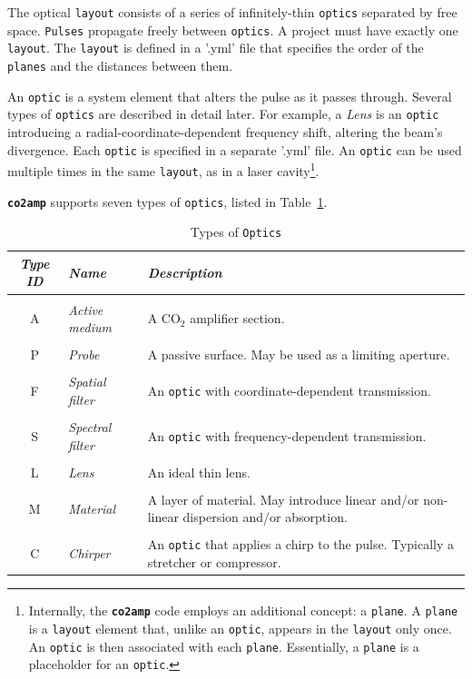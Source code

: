 The optical \texttt{layout} consists of a series of infinitely-thin \texttt{optics} separated by free space. \texttt{Pulses} propagate freely between \texttt{optics}. A project must have exactly one \texttt{layout}. The \texttt{layout} is defined in a '.yml' file that specifies the order of the \texttt{planes} and the distances between them.

An \texttt{optic} is a system element that alters the pulse as it passes through. Several types of \texttt{optics} are described in detail later. For example, a \textit{Lens} is an \texttt{optic} introducing a radial-coordinate-dependent frequency shift, altering the beam's divergence. Each \texttt{optic} is specified in a separate '.yml' file. An \texttt{optic} can be used multiple times in the same \texttt{layout}, as in a laser cavity\footnote{Internally, the \textbf{\texttt{co2amp}} code employs an additional concept: a \texttt{plane}. A \texttt{plane} is a \texttt{layout} element that, unlike an \texttt{optic}, appears in the \texttt{layout} only once. An \texttt{optic} is then associated with each \texttt{plane}. Essentially, a \texttt{plane} is a placeholder for an \texttt{optic}.}.

\textbf{\texttt{co2amp}} supports seven types of \texttt{optics}, listed in Table~\ref{table:optics}.

\begin{table}
\caption{Types of \texttt{Optics}}
\label{table:optics}
\begin{tabularx}{\textwidth}{c l X}
\hline 
\textit{\textbf{Type ID}} & \textit{\textbf{Name}} & \textit{\textbf{Description}}\\
\hline 
&&\\
A & \textit{Active medium} & A CO$_2$ amplifier section.\\
&&\\
P & \textit{Probe} & A passive surface. May be used as a limiting aperture.\\
&&\\
F & \textit{Spatial filter} & An \texttt{optic} with coordinate-dependent transmission.\\
&&\\
S & \textit{Spectral filter} & An \texttt{optic} with frequency-dependent transmission.\\
&&\\
L & \textit{Lens} & An ideal thin lens.\\
&&\\
M & \textit{Material} & A layer of material. May introduce linear and/or non-linear dispersion and/or absorption.\\
&&\\
C & \textit{Chirper} & An \texttt{optic} that applies a chirp to the pulse. Typically a stretcher or compressor.\\
\hline
\end{tabularx}
\end{table}


